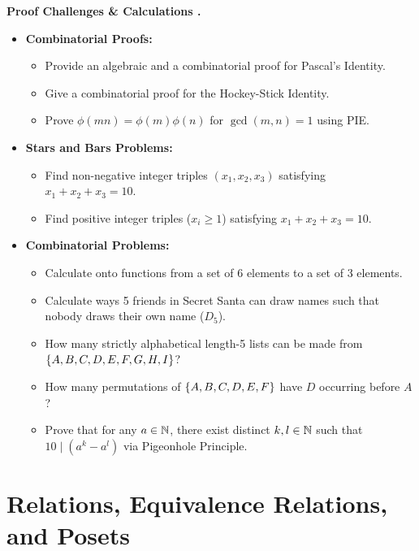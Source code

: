 \documentclass{natsirt}
\newcounter{topic}[section]
\newenvironment{challengebox}[1][]{%
    \begin{redbox}[#1]\refstepcounter{topic}\textbf{Proof Challenges \& Calculations \thesection.\thetopic}%
}{\end{redbox}}
\newcommand{\citem}{\item[$\square$]}
\begin{document}
\begin{challengebox}
    \begin{itemize}
        \citem \textbf{Combinatorial Proofs:}
        \begin{itemize}
            \item Provide an algebraic and a combinatorial proof for Pascal's Identity.
            \item Give a combinatorial proof for the Hockey-Stick Identity.
            \item Prove $\phi(mn) = \phi(m)\phi(n)$ for $\gcd(m, n) = 1$ using PIE.
        \end{itemize}
        \citem \textbf{Stars and Bars Problems:}
        \begin{itemize}
            \item Find non-negative integer triples $(x_1, x_2, x_3)$ satisfying $x_1 + x_2 + x_3 = 10$.
            \item Find positive integer triples ($x_i \ge 1$) satisfying $x_1 + x_2 + x_3 = 10$.
        \end{itemize}
        \citem \textbf{Combinatorial Problems:}
        \begin{itemize}
            \item Calculate onto functions from a set of 6 elements to a set of 3 elements.
            \item Calculate ways 5 friends in Secret Santa can draw names such that nobody draws their own name ($D_5$).
            \item How many strictly alphabetical length-5 lists can be made from $\left\{ A, B, C, D, E, F, G, H, I \right\}$?
            \item How many permutations of $\left\{ A, B, C, D, E, F \right\}$ have $D$ occurring before $A$?
            \item Prove that for any $a \in \mathbb{N}$, there exist distinct $k, l \in \mathbb{N}$ such that $10 \mid (a^k - a^l)$ via Pigeonhole Principle.
        \end{itemize}
    \end{itemize}
\end{challengebox}


\section{Relations, Equivalence Relations, and Posets}
\end{document}
